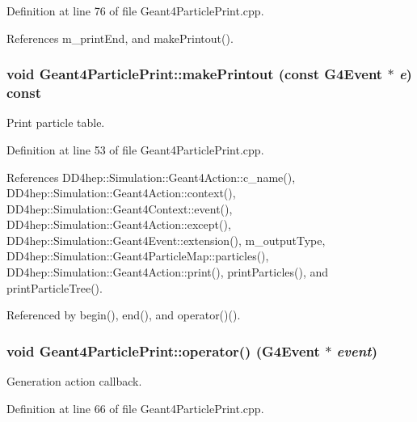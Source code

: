 Definition at line 76 of file Geant4ParticlePrint.cpp.

References m\_\-printEnd, and makePrintout().\hypertarget{class_d_d4hep_1_1_simulation_1_1_geant4_particle_print_af16e29a3fd130065639828fc51bc6fc6}{
\subsubsection[{makePrintout}]{\setlength{\rightskip}{0pt plus 5cm}void Geant4ParticlePrint::makePrintout (const G4Event $\ast$ {\em e}) const}}
\label{class_d_d4hep_1_1_simulation_1_1_geant4_particle_print_af16e29a3fd130065639828fc51bc6fc6}


Print particle table. 

Definition at line 53 of file Geant4ParticlePrint.cpp.

References DD4hep::Simulation::Geant4Action::c\_\-name(), DD4hep::Simulation::Geant4Action::context(), DD4hep::Simulation::Geant4Context::event(), DD4hep::Simulation::Geant4Action::except(), DD4hep::Simulation::Geant4Event::extension(), m\_\-outputType, DD4hep::Simulation::Geant4ParticleMap::particles(), DD4hep::Simulation::Geant4Action::print(), printParticles(), and printParticleTree().

Referenced by begin(), end(), and operator()().\hypertarget{class_d_d4hep_1_1_simulation_1_1_geant4_particle_print_a6aa380c89db0f6359ba163e196b50938}{
\subsubsection[{operator()}]{\setlength{\rightskip}{0pt plus 5cm}void Geant4ParticlePrint::operator() (G4Event $\ast$ {\em event})}}
\label{class_d_d4hep_1_1_simulation_1_1_geant4_particle_print_a6aa380c89db0f6359ba163e196b50938}


Generation action callback. 

Definition at line 66 of file Geant4ParticlePrint.cpp.

